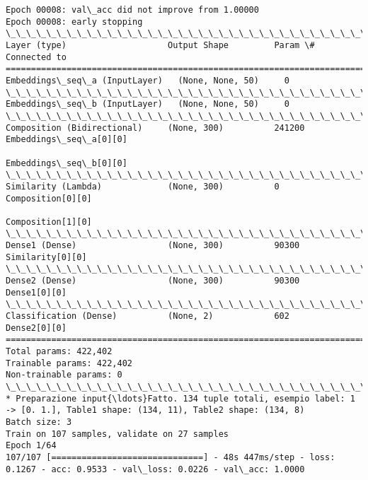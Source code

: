 \documentclass[11pt]{article}
\begin{document}
\begin{Verbatim}[commandchars=\\\{\}]
Epoch 00008: val\_acc did not improve from 1.00000
Epoch 00008: early stopping
\_\_\_\_\_\_\_\_\_\_\_\_\_\_\_\_\_\_\_\_\_\_\_\_\_\_\_\_\_\_\_\_\_\_\_\_\_\_\_\_\_\_\_\_\_\_\_\_\_\_\_\_\_\_\_\_\_\_\_\_\_\_\_\_\_\_\_\_\_\_\_\_\_\_\_\_\_\_\_\_\_\_\_\_\_\_\_\_\_\_\_\_\_\_\_\_\_\_
Layer (type)                    Output Shape         Param \#     Connected to                     
==================================================================================================
Embeddings\_seq\_a (InputLayer)   (None, None, 50)     0                                            
\_\_\_\_\_\_\_\_\_\_\_\_\_\_\_\_\_\_\_\_\_\_\_\_\_\_\_\_\_\_\_\_\_\_\_\_\_\_\_\_\_\_\_\_\_\_\_\_\_\_\_\_\_\_\_\_\_\_\_\_\_\_\_\_\_\_\_\_\_\_\_\_\_\_\_\_\_\_\_\_\_\_\_\_\_\_\_\_\_\_\_\_\_\_\_\_\_\_
Embeddings\_seq\_b (InputLayer)   (None, None, 50)     0                                            
\_\_\_\_\_\_\_\_\_\_\_\_\_\_\_\_\_\_\_\_\_\_\_\_\_\_\_\_\_\_\_\_\_\_\_\_\_\_\_\_\_\_\_\_\_\_\_\_\_\_\_\_\_\_\_\_\_\_\_\_\_\_\_\_\_\_\_\_\_\_\_\_\_\_\_\_\_\_\_\_\_\_\_\_\_\_\_\_\_\_\_\_\_\_\_\_\_\_
Composition (Bidirectional)     (None, 300)          241200      Embeddings\_seq\_a[0][0]           
                                                                 Embeddings\_seq\_b[0][0]           
\_\_\_\_\_\_\_\_\_\_\_\_\_\_\_\_\_\_\_\_\_\_\_\_\_\_\_\_\_\_\_\_\_\_\_\_\_\_\_\_\_\_\_\_\_\_\_\_\_\_\_\_\_\_\_\_\_\_\_\_\_\_\_\_\_\_\_\_\_\_\_\_\_\_\_\_\_\_\_\_\_\_\_\_\_\_\_\_\_\_\_\_\_\_\_\_\_\_
Similarity (Lambda)             (None, 300)          0           Composition[0][0]                
                                                                 Composition[1][0]                
\_\_\_\_\_\_\_\_\_\_\_\_\_\_\_\_\_\_\_\_\_\_\_\_\_\_\_\_\_\_\_\_\_\_\_\_\_\_\_\_\_\_\_\_\_\_\_\_\_\_\_\_\_\_\_\_\_\_\_\_\_\_\_\_\_\_\_\_\_\_\_\_\_\_\_\_\_\_\_\_\_\_\_\_\_\_\_\_\_\_\_\_\_\_\_\_\_\_
Dense1 (Dense)                  (None, 300)          90300       Similarity[0][0]                 
\_\_\_\_\_\_\_\_\_\_\_\_\_\_\_\_\_\_\_\_\_\_\_\_\_\_\_\_\_\_\_\_\_\_\_\_\_\_\_\_\_\_\_\_\_\_\_\_\_\_\_\_\_\_\_\_\_\_\_\_\_\_\_\_\_\_\_\_\_\_\_\_\_\_\_\_\_\_\_\_\_\_\_\_\_\_\_\_\_\_\_\_\_\_\_\_\_\_
Dense2 (Dense)                  (None, 300)          90300       Dense1[0][0]                     
\_\_\_\_\_\_\_\_\_\_\_\_\_\_\_\_\_\_\_\_\_\_\_\_\_\_\_\_\_\_\_\_\_\_\_\_\_\_\_\_\_\_\_\_\_\_\_\_\_\_\_\_\_\_\_\_\_\_\_\_\_\_\_\_\_\_\_\_\_\_\_\_\_\_\_\_\_\_\_\_\_\_\_\_\_\_\_\_\_\_\_\_\_\_\_\_\_\_
Classification (Dense)          (None, 2)            602         Dense2[0][0]                     
==================================================================================================
Total params: 422,402
Trainable params: 422,402
Non-trainable params: 0
\_\_\_\_\_\_\_\_\_\_\_\_\_\_\_\_\_\_\_\_\_\_\_\_\_\_\_\_\_\_\_\_\_\_\_\_\_\_\_\_\_\_\_\_\_\_\_\_\_\_\_\_\_\_\_\_\_\_\_\_\_\_\_\_\_\_\_\_\_\_\_\_\_\_\_\_\_\_\_\_\_\_\_\_\_\_\_\_\_\_\_\_\_\_\_\_\_\_
* Preparazione input{\ldots}Fatto. 134 tuple totali, esempio label: 1 -> [0. 1.], Table1 shape: (134, 11), Table2 shape: (134, 8)
Batch size: 3
Train on 107 samples, validate on 27 samples
Epoch 1/64
107/107 [==============================] - 48s 447ms/step - loss: 0.1267 - acc: 0.9533 - val\_loss: 0.0226 - val\_acc: 1.0000


\end{Verbatim}
\end{document}
